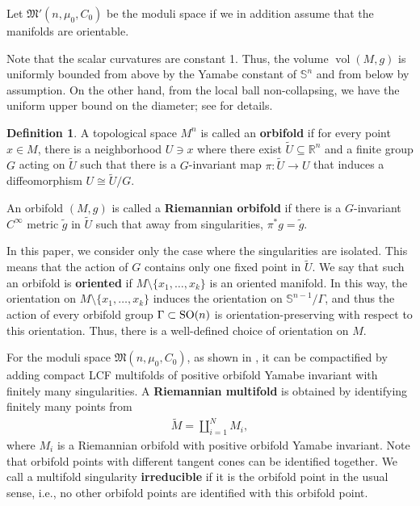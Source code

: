 \documentclass[12pt]{amsart}
\theoremstyle{definition}
\newtheorem{definition}[theorem]{Definition}
\begin{document}
Let $\mathfrak{M}'(n, \mu_0, C_0)$ be the moduli space if we in addition assume that the manifolds are orientable.

Note that the scalar curvatures are constant 1. Thus, the volume $\operatorname{vol}(M,g)$ is uniformly bounded from above by the Yamabe constant of $\mathbb{S}^n$ and from below by assumption. On the other hand, from the local ball non-collapsing, we have the uniform upper bound on the diameter; see \cite{Aku} for details.




\begin{definition}
A topological space $M^n$ is called an \textbf{orbifold} if for every point $x\in M$, there is a neighborhood $U\ni x$ where there exist $\tilde{U} \subseteq \mathbb{R}^n$ and a finite group $G$ acting on $\tilde{U}$ such that there is a $G$-invariant map $\pi: \tilde{U}\to U$ that induces a diffeomorphism $U\cong\tilde{U}/G$.

An orbifold $(M,g)$ is called a \textbf{Riemannian orbifold} if there is a $G$-invariant $C^\infty$ metric $\tilde{g}$ in $\tilde{U}$ such that away from singularities, $\pi^* g = \tilde{g}$.
\end{definition}

In this paper, we consider only the case where the singularities are isolated. This means that the action of $G$ contains only one fixed point in $\tilde{U}$. We say that such an orbifold is \textbf{oriented} if $M \setminus \{x_1, \dots, x_k\}$ is an oriented manifold. In this way, the orientation on $M \setminus \{x_1, \dots, x_k\}$ induces the orientation on $\mathbb{S}^{n-1}/\Gamma$, and thus the action of every orbifold group $\Gamma \subset {\rm{SO}}(n)$ is orientation-preserving with respect to this orientation. Thus, there is a well-defined choice of orientation on $M$.


For the moduli space $\mathfrak{M}(n, \mu_0, C_0)$, as shown in \cite{TV2}, it can be compactified by adding compact LCF multifolds of positive orbifold Yamabe invariant with finitely many singularities. A \textbf{Riemannian multifold} is obtained by identifying finitely many points from
\begin{align*}
    \tilde{M}=\coprod_{i=1}^N M_i,
\end{align*}
where $M_i$ is a Riemannian orbifold with positive orbifold Yamabe invariant. Note that orbifold points with different tangent cones can be identified together. We call a multifold singularity \textbf{irreducible} if it is the orbifold point in the usual sense, i.e., no other orbifold points are identified with this orbifold point.
\end{document}
